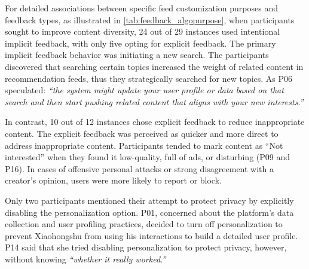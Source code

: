 For detailed associations between specific feed customization purposes and feedback types, as illustrated in \autoref{tab:feedback_algopurpose}, when participants sought to improve content diversity, 24 out of 29 instances used intentional implicit feedback, with only five opting for explicit feedback. The primary implicit feedback behavior was initiating a new search. The participants discovered that searching certain topics increased the weight of related content in recommendation feeds, thus they strategically searched for new topics. As P06 speculated: \textit{``the system might update your user profile or data based on that search and then start pushing related content that aligns with your new interests.''}

In contrast, 10 out of 12 instances chose explicit feedback to reduce inappropriate content. The explicit feedback was perceived as quicker and more direct to address inappropriate content. Participants tended to mark content as ``Not interested'' when they found it low-quality, full of ads, or disturbing (P09 and P16). In cases of offensive personal attacks or strong disagreement with a creator's opinion, users were more likely to report or block. 


Only two participants mentioned their attempt to protect privacy by explicitly disabling the personalization option. P01, concerned about the platform's data collection and user profiling practices, decided to turn off personalization to prevent Xiaohongshu from using his interactions to build a detailed user profile. P14 said that she tried disabling personalization to protect privacy, however, without knowing \textit{``whether it really worked.''} 

